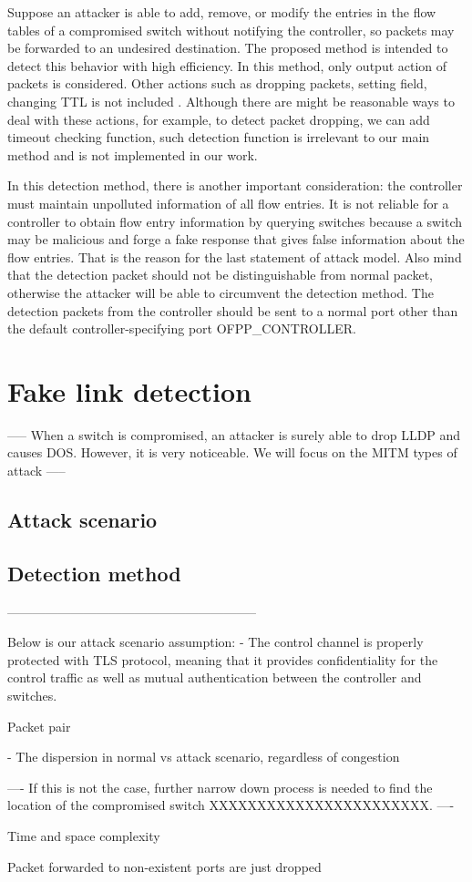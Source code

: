 Suppose an attacker is able to add, remove, or modify the entries in the flow tables of a compromised
switch without notifying the controller, so packets may be forwarded to an undesired destination. The proposed method is intended to detect this behavior with high efficiency. In this method, only output action of packets is considered. Other actions such as dropping packets, setting field, changing TTL is not included \sout{}. Although there are might be reasonable ways to deal with these actions, for example, to detect packet dropping, we can add timeout checking function, such detection function is irrelevant to our main method and is not implemented in our work.

In this detection method, there is another important consideration: the controller must maintain unpolluted information of all flow entries. It is not reliable for a controller to obtain flow entry information by querying switches because a switch may be malicious and forge a fake response that gives false information about the flow entries. That is the reason for the last statement of attack model. Also mind that the detection packet should not be distinguishable from normal packet, otherwise the attacker will be able to circumvent the detection method. The detection packets from the controller should be sent to a normal port other than the default controller-specifying port OFPP_CONTROLLER. 

\section{Fake link detection}

-----
When a switch is compromised, an attacker is surely able to drop LLDP and causes DOS. However, it is very noticeable. We will focus on the MITM types of attack
-----
\subsection{Attack scenario}
\subsection{Detection method}


-----------------------------------------------------------

Below is our attack scenario assumption: 
- The control channel is properly protected with TLS protocol, meaning
that it provides confidentiality for the control traffic as well as mutual
authentication between the controller and switches.

Packet pair

- The dispersion in normal vs attack scenario, regardless of congestion

----
If this is not the case, further narrow down process is needed to find the location of the compromised switch XXXXXXXXXXXXXXXXXXXXXXX.
----

Time and space complexity


Packet forwarded to non-existent ports are just dropped
